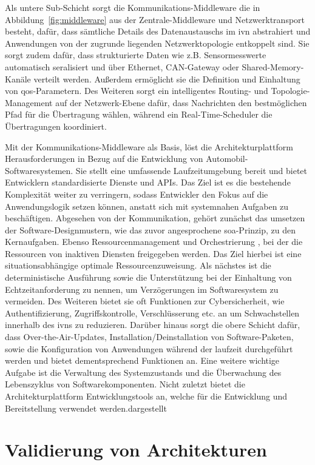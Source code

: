 Als untere Sub-Schicht sorgt die Kommunikations-Middleware die in Abbildung~\ref{fig:middleware} aus der Zentrale-Middleware und Netzwerktransport besteht, dafür, dass sämtliche Details des Datenaustauschs im \gls{ivn} abstrahiert und Anwendungen von der zugrunde liegenden Netzwerktopologie entkoppelt sind. Sie sorgt zudem dafür, dass strukturierte Daten wie z.B. Sensormesswerte automatisch seralisiert und über Ethernet, CAN-Gateway oder Shared-Memory-Kanäle verteilt werden. Außerdem ermöglicht sie die Definition und Einhaltung von \gls{qos}-Parametern. Des Weiteren sorgt ein intelligentes Routing- und Topologie-Management auf der Netzwerk-Ebene dafür, dass Nachrichten den bestmöglichen Pfad für die Übertragung wählen, während ein Real-Time-Scheduler die Übertragungen koordiniert.

Mit der Kommunikations-Middleware als Basis, löst die Architekturplattform Herausforderungen in Bezug auf die Entwicklung von Automobil-Softwaresystemen. Sie stellt eine umfassende Laufzeitumgebung bereit und bietet Entwicklern standardisierte Dienste und APIs. Das Ziel ist es die bestehende Komplexität weiter zu verringern, sodass Entwickler den Fokus auf die Anwendungslogik setzen können, anstatt sich mit systemnahen Aufgaben zu beschäftigen. Abgesehen von der Kommunikation, gehört zunächst das umsetzen der Software-Designmustern, wie das zuvor angesprochene \gls{soa}-Prinzip, zu den Kernaufgaben. Ebenso Ressourcenmanagement und Orchestrierung , bei der die Ressourcen von inaktiven Diensten freigegeben werden. Das Ziel hierbei ist eine situationsabhängige optimale Ressourcenzuweisung. Als nächstes ist die deterministische Ausführung sowie die Unterstützung bei der Einhaltung von Echtzeitanforderung zu nennen, um Verzögerungen im Softwaresystem zu vermeiden. Des Weiteren bietet sie oft Funktionen zur Cybersicherheit, wie Authentifizierung, Zugriffskontrolle, Verschlüsserung etc. an um Schwachstellen innerhalb des \glspl{ivn} zu reduzieren. Darüber hinaus sorgt die obere Schicht dafür, dass Over-the-Air-Updates, Installation/Deinstallation von Software-Paketen, sowie die Konfiguration von Anwendungen während der laufzeit durchgeführt werden und bietet dementsprechend Funktionen an. Eine weitere wichtige Aufgabe ist die Verwaltung des Systemzustands und die Überwachung des Lebenszyklus von Softwarekomponenten. Nicht zuletzt bietet die Architekturplattform Entwicklungstools an, welche für die Entwicklung und Bereitstellung verwendet werden.dargestellt

\section{Validierung von Architekturen}
\label{sect:validerung}

